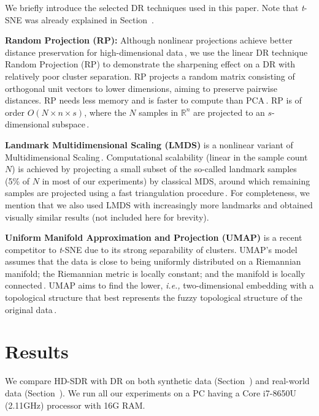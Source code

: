 \documentclass[sagev,Afour,times]{sagej}
\begin{document}
We briefly introduce the selected DR techniques used in this paper. Note that \emph{t}-SNE was already explained in Section~.

\noindent\textbf{Random Projection (RP):} Although nonlinear projections achieve better distance preservation for high-dimensional data\,\cite{sorzano14,isomap:original}, we use the linear DR technique Random Projection (RP) to demonstrate the sharpening effect on a DR with relatively poor cluster separation. RP projects a random matrix consisting of orthogonal unit vectors to lower dimensions, aiming to preserve pairwise distances. RP needs less memory and is faster to compute than PCA\,\cite{RP1:randomProj,rp2:randomproj_survey,pca}. RP is of order $O(N\times n\times s)$, where the $N$ samples in $\mathbb{R}^n$ are projected to an $s$-dimensional subspace\,\cite{RP1:randomProj,rp2:randomproj_survey}.

\noindent\textbf{Landmark Multidimensional Scaling (LMDS)} is a nonlinear variant of Multidimensional Scaling\,\cite{MDS}. Computational scalability (linear in the sample count $N$) is achieved by projecting a small subset of the so-called landmark samples (5\% of $N$ in most of our experiments) by classical MDS, around which remaining samples are projected using a fast triangulation procedure\,\cite{lmds:original}. For completeness, we mention that we also used LMDS with increasingly more landmarks and obtained visually similar results (not included here for brevity).

\noindent\textbf{Uniform Manifold Approximation and Projection (UMAP)} is a recent competitor to \emph{t}-SNE due to its strong separability of clusters. UMAP's model assumes that the data is close to being uniformly distributed on a Riemannian manifold; the Riemannian metric is locally constant; and the manifold is locally connected\,\cite{umap2018}. UMAP aims to find the lower, \emph{i.e.,} two-dimensional embedding with a topological structure that best represents the fuzzy topological structure of the original data\,\cite{umap2018}.

\section{Results}
\label{sec:results}
We compare HD-SDR with DR on both synthetic data (Section~) and real-world data (Section~). We run all our experiments on a PC having a Core i7-8650U (2.11GHz) processor with 16G RAM.
\end{document}

